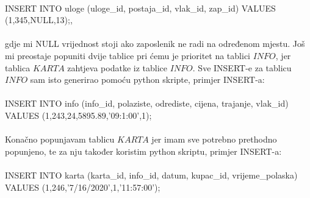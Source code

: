 \documentclass{OM_style}
\begin{document}
\\
INSERT INTO uloge (uloge\_id, postaja\_id, vlak\_id, zap\_id) VALUES (1,345,NULL,13);, \\
\\
gdje mi NULL vrijednost stoji ako zaposlenik ne radi na određenom mjestu.
Još mi preostaje popuniti dvije tablice pri ćemu je prioritet na tablici $INFO$, jer tablica $KARTA$ zahtjeva podatke iz tablice $INFO$.
Sve INSERT-e za tablicu $INFO$ sam isto generirao pomoću python skripte, primjer INSERT-a:\\
\\
INSERT INTO info (info\_id, polaziste, odrediste, cijena, trajanje, vlak\_id) VALUES (1,243,24,5895.89,'09:1:00',1); \\
\\
Konačno popunjavam tablicu $KARTA$ jer imam sve potrebno prethodno popunjeno, te za nju također koristim python skriptu, primjer INSERT-a:\\ 
\\
INSERT INTO karta (karta\_id, info\_id, datum, kupac\_id, vrijeme\_polaska) VALUES (1,246,'7/16/2020',1,'11:57:00'); 
\end{document}
